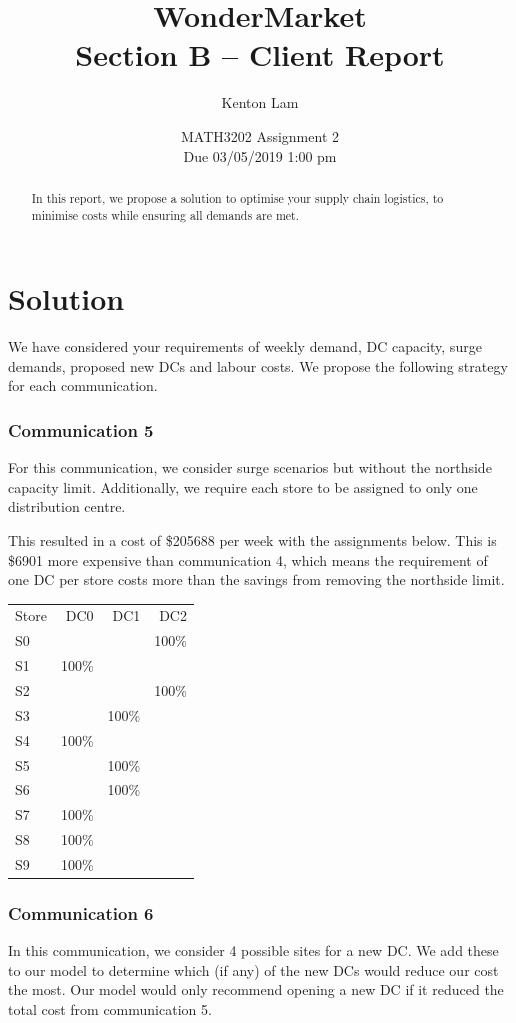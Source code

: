 \documentclass[11pt,a4paper]{article}
\author{Kenton Lam}
\date{{MATH3202 Assignment 2 \\ Due 03/05/2019 1:00 pm}}
\title{WonderMarket \\ 
Section B -- Client Report}
\begin{document}
\maketitle
\begin{abstract}
    In this report, we propose a solution to optimise your supply chain logistics, 
    to minimise costs while ensuring all demands are met.
\end{abstract}

\part{Solution}
We have considered your requirements of weekly demand, DC capacity, surge demands, 
proposed new DCs and labour costs.
We propose the following strategy for each communication.

\section{Communication 5}
For this communication, we consider surge scenarios but without the northside capacity 
limit. 
Additionally, we require each store to be assigned to only one distribution centre. 

This resulted in a cost of \$205688 per week with the assignments below. This is \$6901 
more expensive than communication 4, which means the requirement of one DC per store 
costs more than the savings from removing the northside limit.\\[1em]
\begin{tabular}{l  r  r  r }
    Store & DC0 & DC1 & DC2 \\
    S0 &  &  & 100\% \\
    S1 & 100\% &  &  \\
    S2 &  &  & 100\% \\
    S3 &  & 100\% &  \\
    S4 & 100\% &  &  \\
    S5 &  & 100\% &  \\
    S6 &  & 100\% &  \\
    S7 & 100\% &  &  \\
    S8 & 100\% &  &  \\
    S9 & 100\% &  &  \\
\end{tabular}
\pagebreak

\section{Communication 6}
In this communication, we consider 4 possible sites for a new DC. 
We add these to our model to determine which (if any) of the new 
DCs would reduce our cost the most.
Our model would only recommend opening a new DC if it reduced 
the total cost from communication 5.
\end{document}
